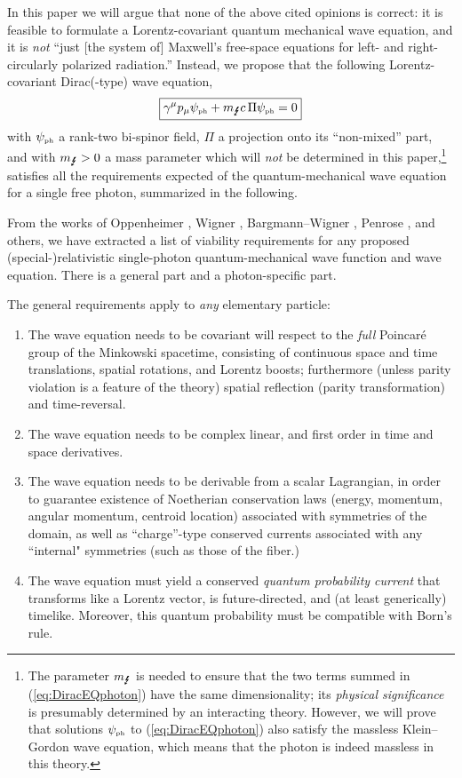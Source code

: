 \documentclass[12pt]{article}
\theoremstyle{definition}
\newcommand{\refeq}[1]{(\ref{#1})}
\numberwithin{equation}{section}
\newcommand{\beq}{\begin{equation}}
\newcommand{\eeq}{\end{equation}}
\newcommand{\psiPH}{{\psi_{\mbox{\rm\tiny ph}}}}
\newcommand{\mPH}{{m_{\mbox{\Lightning}}}}
\newcommand{\ga}{\gamma}
\begin{document}
 In this paper we will argue that none of the above cited opinions is correct: it is feasible to formulate
a Lorentz-covariant quantum mechanical wave equation, and it is \emph{not} ``just [the system of] Maxwell's
free-space equations for left- and right-circularly polarized radiation.'' 
 Instead, we propose that the following Lorentz-covariant Dirac(-type) wave equation, 
\beq \label{eq:DiracEQphoton} 
\boxed{\ga^\mu p_\mu \psiPH  + \mPH c\,\Pi \psiPH= 0}
\eeq
with $\psiPH$ a rank-two bi-spinor field, $\Pi$ a projection onto its ``non-mixed'' part,
and with $\mPH>0$ a mass parameter which will \emph{not} be determined in this paper,\footnote{The parameter $\mPH$ is {needed} 
  to ensure that the two terms summed in \refeq{eq:DiracEQphoton} have the same dimensionality; its \emph{physical significance}
  is presumably determined by an interacting theory.
  However, we will prove that solutions $\psiPH$ to \refeq{eq:DiracEQphoton} also satisfy the massless Klein--Gordon wave 
  equation, which means that the photon is indeed massless in this theory.}
satisfies all the requirements expected of the quantum-mechanical wave equation for a single free photon, 
summarized in the following.
 
From the works of Oppenheimer \cite{OppiPHOTON}, Wigner \cite{Wig1939}, Bargmann--Wigner \cite{BarWig1948}, 
Penrose \cite{Pen1976}, and others, we have extracted a list of
viability requirements for any proposed (special-)relativistic single-photon quantum-mechanical wave function and wave equation.
 There is a general part and a photon-specific part.
\smallskip

 The general requirements apply to {\em any} elementary particle:
\begin{enumerate}
\item The wave equation needs to be covariant will respect to the {\em full} Poincar\'e group of the Minkowski spacetime, consisting 
of continuous space and time translations, spatial rotations, and Lorentz boosts; 
furthermore (unless parity violation is a feature of the theory) spatial reflection (parity transformation) and time-reversal.
\item The wave equation needs to be complex linear, and first order in time and space derivatives.
\item The wave equation needs to be derivable from a scalar Lagrangian, in  order to guarantee existence of Noetherian conservation 
laws (energy, momentum,  angular momentum, centroid location) associated with symmetries of the domain, as well as ``charge''-type 
conserved currents associated with any ``internal" symmetries (such as those of the fiber.)
\item The wave equation must yield a conserved {\em quantum probability current} that transforms like a Lorentz 
vector, is future-directed, and (at least generically) timelike.
 Moreover, this quantum probability must be compatible with Born's rule.
\end{enumerate}
\end{document}
